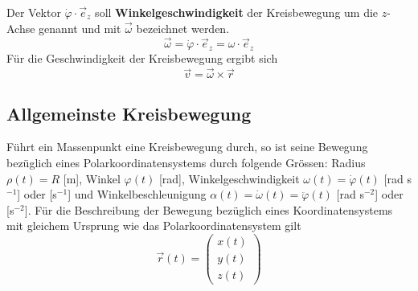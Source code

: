 Der Vektor $\dot{\varphi}\cdot \overrightarrow{e}_z$ soll \textbf{Winkelgeschwindigkeit} der Kreisbewegung um die $z$-Achse genannt und mit $\overrightarrow{\omega}$ bezeichnet werden.
\begin{equation}
\boxed{\overrightarrow{\omega}=\dot{\varphi}\cdot \overrightarrow{e}_z=\omega\cdot \overrightarrow{e}_z}
\end{equation}
Für die Geschwindigkeit der Kreisbewegung ergibt sich
\begin{equation}
\boxed{\overrightarrow{v}=\overrightarrow{\omega}\times \overrightarrow{r}}
\end{equation}
\subsection{Allgemeinste Kreisbewegung}
Führt ein Massenpunkt eine Kreisbewegung durch, so ist seine Bewegung bezüglich eines Polarkoordinatensystems durch folgende Grössen: Radius $\rho\left(t\right)=R$ [m], Winkel $\varphi\left(t\right)$ [rad], Winkelgeschwindigkeit $\omega\left(t\right)=\dot{\varphi}\left(t\right)$ [rad s$^{-1}$] oder [s$^{-1}$] und Winkelbeschleunigung $\alpha\left(t\right)=\dot{\omega}\left(t\right)=\ddot{\varphi}\left(t\right)$ [rad s$^{-2}$] oder [s$^{-2}$]. Für die Beschreibung der Bewegung bezüglich eines Koordinatensystems mit gleichem Ursprung wie das Polarkoordinatensystem gilt
\begin{equation}
\boxed{\overrightarrow{r}\left(t\right)=\begin{pmatrix}x\left(t\right)\\y\left(t\right)\\z
\left(t\right)\end{pmatrix}}
\end{equation}